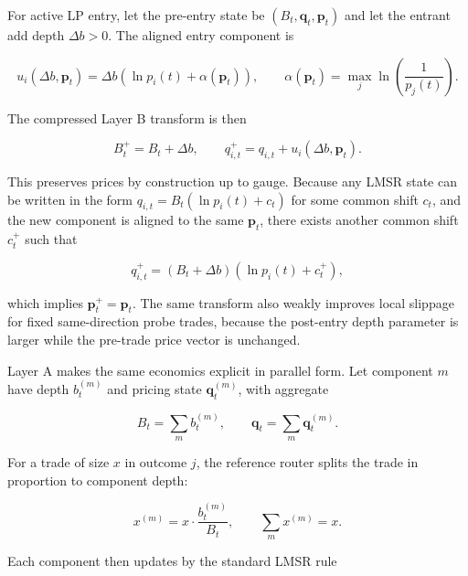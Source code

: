 \documentclass[10pt]{article}
\begin{document}
For active LP entry, let the pre-entry state be $(B_t,\mathbf{q}_t,\mathbf{p}_t)$ and let the entrant add depth $\Delta b > 0$. The aligned entry component is

\[
u_i(\Delta b,\mathbf{p}_t) = \Delta b \left(\ln p_i(t) + \alpha(\mathbf{p}_t)\right),
\qquad
\alpha(\mathbf{p}_t) = \max_j \ln \left(\frac{1}{p_j(t)}\right).
\]

The compressed Layer B transform is then

\[
B_t^{+} = B_t + \Delta b,
\qquad
q_{i,t}^{+} = q_{i,t} + u_i(\Delta b,\mathbf{p}_t).
\]

\begin{center}
\setlength{\fboxsep}{8pt}
\end{center}

This preserves prices by construction up to gauge. Because any LMSR state can be written in the form $q_{i,t} = B_t(\ln p_i(t) + c_t)$ for some common shift $c_t$, and the new component is aligned to the same $\mathbf{p}_t$, there exists another common shift $c_t^{+}$ such that

\[
q_{i,t}^{+} = (B_t + \Delta b)\left(\ln p_i(t) + c_t^{+}\right),
\]

which implies $\mathbf{p}_t^{+} = \mathbf{p}_t$. The same transform also weakly improves local slippage for fixed same-direction probe trades, because the post-entry depth parameter is larger while the pre-trade price vector is unchanged.

Layer A makes the same economics explicit in parallel form. Let component $m$ have depth $b_t^{(m)}$ and pricing state $\mathbf{q}_t^{(m)}$, with aggregate

\[
B_t = \sum_m b_t^{(m)}, \qquad \mathbf{q}_t = \sum_m \mathbf{q}_t^{(m)}.
\]

For a trade of size $x$ in outcome $j$, the reference router splits the trade in proportion to component depth:

\[
x^{(m)} = x \cdot \frac{b_t^{(m)}}{B_t},
\qquad
\sum_m x^{(m)} = x.
\]

Each component then updates by the standard LMSR rule
\end{document}
